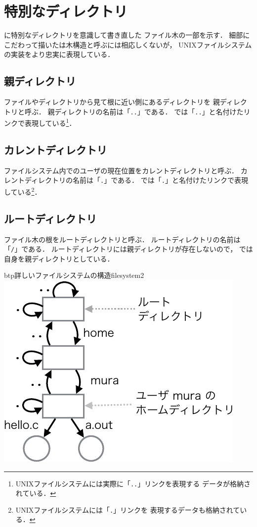 \section{特別なディレクトリ}
に特別なディレクトリを意識して書き直した
ファイル木の一部を示す．
細部にこだわって描いたは木構造と呼ぶには相応しくないが，
UNIXファイルシステムの実装をより忠実に表現している．

\subsection*{親ディレクトリ}
ファイルやディレクトリから見て根に近い側にあるディレクトリを
親ディレクトリと呼ぶ．
親ディレクトリの名前は「\texttt{..}」である．
では「\texttt{..}」と名付けたリンクで表現している\footnote{
UNIXファイルシステムには実際に「\texttt{..}」リンクを表現する
データが格納されている．}．

\subsection*{カレントディレクトリ}
ファイルシステム内でのユーザの現在位置をカレントディレクトリと呼ぶ．
カレントディレクトリの名前は「\texttt{.}」である．
では「\texttt{.}」と名付けたリンクで表現している\footnote{
UNIXファイルシステムには「\texttt{.}」リンクを
表現するデータも格納されている．}．

\subsection*{ルートディレクトリ}
ファイル木の根をルートディレクトリと呼ぶ．
ルートディレクトリの名前は「\texttt{/}」である．
ルートディレクトリには親ディレクトリが存在しないので，
では自身を親ディレクトリとしている．

\begin{myfig}{btp}{詳しいファイルシステムの構造}{filesystem2}
\includegraphics[scale=1.0]{Fig/FileSystem2-crop.pdf}
\end{myfig}

